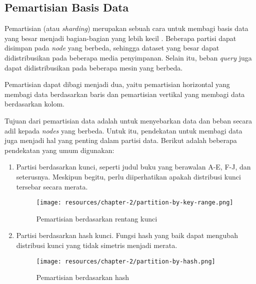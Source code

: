 \subsection{Pemartisian Basis Data}

Pemartisian (atau \textit{sharding}) merupakan sebuah cara untuk membagi basis data yang besar menjadi bagian-bagian yang lebih kecil \parencite{dataIntensiveApplications}. Beberapa partisi dapat disimpan pada \textit{node} yang berbeda, sehingga dataset yang besar dapat didistribusikan pada beberapa media penyimpanan. Selain itu, beban \textit{query} juga dapat didistribusikan pada beberapa mesin yang berbeda.

Pemartisian dapat dibagi menjadi dua, yaitu pemartisian horizontal yang membagi data berdasarkan baris dan pemartisian vertikal yang membagi data berdasarkan kolom.

Tujuan dari pemartisian data adalah untuk menyebarkan data dan beban secara adil kepada \textit{nodes} yang berbeda. Untuk itu, pendekatan untuk membagi data juga menjadi hal yang penting dalam partisi data. Berikut adalah beberapa pendekatan yang umum digunakan:

\begin{enumerate}
    \item Partisi berdasarkan kunci, seperti judul buku yang berawalan A-E, F-J, dan seterusnya. Meskipun begitu, perlu diiperhatikan apakah distribusi kunci tersebar secara merata.
          \begin{figure}[ht]
              \centering
              \texttt{[image: resources/chapter-2/partition-by-key-range.png]}
              \caption{Pemartisian berdasarkan rentang kunci \parencite{dataIntensiveApplications}}
              \label{fig: partition-by-key-range}
          \end{figure}

    \item Partisi berdasarkan hash kunci. Fungsi hash yang baik dapat mengubah distribusi kunci yang tidak simetris menjadi merata.
          \begin{figure}[ht]
              \centering
              \texttt{[image: resources/chapter-2/partition-by-hash.png]}
              \caption{Pemartisian berdasarkan hash \parencite{dataIntensiveApplications}}
              \label{fig:partition-by-hash}
          \end{figure}

\end{enumerate}